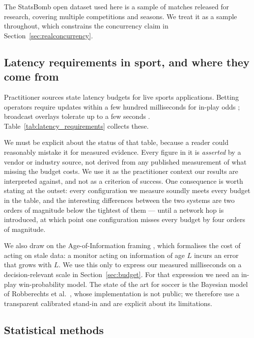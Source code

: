 \documentclass[Afour,sageh,times]{sagej}
\begin{document}
The StatsBomb open dataset \cite{statsbomb2023} used here is a sample of matches released for
research, covering multiple competitions and seasons. We treat it as a sample throughout, which
constrains the concurrency claim in Section~\ref{sec:realconcurrency}.

\subsection{Latency requirements in sport, and where they come from}
\label{sec:lit_requirements}

Practitioner sources state latency budgets for live sports applications. Betting operators
require updates within a few hundred milliseconds for in-play odds
\cite{v2solutions2025,ververica2025}; broadcast overlays tolerate up to a few seconds
\cite{dolby2025,promwad2025}. Table~\ref{tab:latency_requirements} collects these.

We must be explicit about the status of that table, because a reader could reasonably mistake it
for measured evidence. Every figure in it is \emph{asserted} by a vendor or industry source, not
derived from any published measurement of what missing the budget costs. We use it as the
practitioner context our results are interpreted against, and not as a criterion of success. One
consequence is worth stating at the outset: every configuration we measure soundly meets every
budget in the table, and the interesting differences between the two systems are two orders of
magnitude below the tightest of them --- until a network hop is introduced, at which point one
configuration misses every budget by four orders of magnitude.

We also draw on the Age-of-Information framing \cite{kaul2012realtime}, which formalises the cost
of acting on stale data: a monitor acting on information of age $L$ incurs an error that grows
with $L$. We use this only to express our measured milliseconds on a decision-relevant scale in
Section~\ref{sec:budget}. For that expression we need an in-play win-probability model. The state
of the art for soccer is the Bayesian model of Robberechts et al.\ \cite{robberechts2021bayesian},
whose implementation is not public; we therefore use a transparent calibrated stand-in and are
explicit about its limitations.

\subsection{Statistical methods}
\label{sec:lit_stats}
\end{document}
